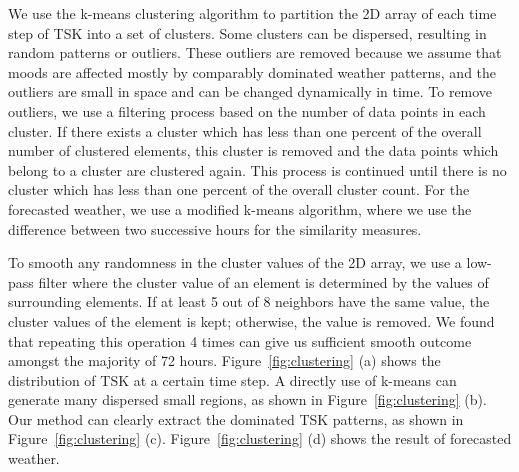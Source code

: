 We use the k-means clustering algorithm to partition the 2D array of each time step of TSK into a set of clusters. Some clusters can be dispersed, resulting in random patterns or outliers. These outliers are removed because we assume that moods are affected mostly by comparably dominated weather patterns, and the outliers are small in space and can be changed dynamically in time. To remove outliers, we use a filtering process based on the number of data points in each cluster. If there exists a cluster which has less than one percent of the overall number of clustered elements, this cluster is removed and the data points which belong to a cluster are clustered again. This process is continued until there is no cluster which has less than one percent of the overall cluster count. For the forecasted weather, we use a modified k-means algorithm, where we use the difference between two successive hours for the similarity measures.

%


To smooth any randomness in the cluster values of the 2D array, we use a low-pass filter where the cluster value of an element is determined by the values of surrounding elements.
If at least 5 out of 8 neighbors have the same value, the cluster values of the element is kept; otherwise, the value is removed. We found that repeating this operation 4 times can give us sufficient smooth outcome amongst the majority of 72 hours.
Figure~\ref{fig:clustering} (a) shows the distribution of TSK at a certain time step. A directly use of k-means can generate many dispersed small regions, as shown in Figure~\ref{fig:clustering} (b). Our method can clearly extract the dominated TSK patterns, as shown in Figure~\ref{fig:clustering} (c). Figure~\ref{fig:clustering} (d) shows the result of forecasted weather.

